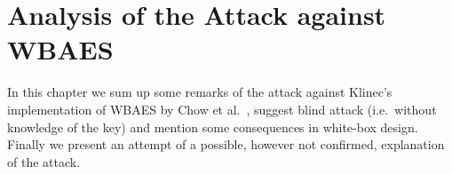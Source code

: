 \chapter{Analysis of the Attack against WBAES}
\label{chap:analysis}

In this chapter we sum up some remarks of the attack against Klinec's implementation \cite{klinec2013implementation} of WBAES by Chow et al.\ \cite{chow2002aes}, suggest blind attack (i.e.\ without knowledge of the key) and mention some consequences in white-box design. Finally we present an attempt of a possible, however not confirmed, explanation of the attack.







